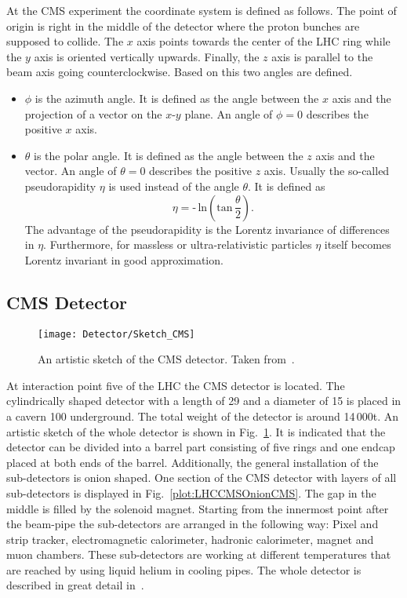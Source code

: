 At the CMS experiment the coordinate system is defined as follows. The point of origin is right in the middle of the detector where the proton bunches are supposed to collide. The $x$ axis points towards the center of the LHC ring while the $y$ axis is oriented vertically upwards. Finally, the $z$ axis is parallel to the beam axis going counterclockwise. Based on this two angles are defined.
\begin{itemize}
    \item{$\phi{}$} is the azimuth angle. It is defined as the angle between the $x$ axis and the projection of a vector on the $x$-$y$ plane. An angle of $\phi{} = 0$ describes the positive $x$ axis.
    \item{$\theta{}$} is the polar angle. It is defined as the angle between the $z$ axis and the vector. An angle of $\theta{} = 0$ describes the positive $z$ axis. Usually the so-called pseudorapidity $\eta{}$ is used instead of the angle $\theta$. It is defined as
    \begin{equation}
        \eta{} = \textrm{-}\,{}\textrm{ln} \left( \textrm{tan}\,{}\frac{\theta{}}{2}\right).
        \label{eq:pseudorapidity}
    \end{equation}
    The advantage of the pseudorapidity is the Lorentz invariance of differences in $\eta{}$. Furthermore, for massless or ultra-relativistic particles $\eta$ itself becomes Lorentz invariant in good approximation.
\end{itemize}

\subsection{CMS Detector \label{LHCCMSCMSDet}}

\begin{figure}[Hb]
    \centering
    \texttt{[image: Detector/Sketch\_CMS]}
    \caption[Artistic sketch of the CMS detector]{An artistic sketch of the CMS detector. Taken from~. \label{plot:LHCCMSWholeCMS}}
\end{figure}

At interaction point five of the LHC the CMS detector is located. The cylindrically shaped detector with a length of 29\m{} and a diameter of 15\m{} is placed in a cavern 100\m{} underground. The total weight of the detector is around 14\,000\unit{t}. An artistic sketch of the whole detector is shown in Fig.~\ref{plot:LHCCMSWholeCMS}. It is indicated that the detector can be divided into a barrel part consisting of five rings and one endcap placed at both ends of the barrel. Additionally, the general installation of the sub-detectors is onion shaped. One section of the CMS detector with layers of all sub-detectors is displayed in Fig.~\ref{plot:LHCCMSOnionCMS}. The gap in the middle is filled by the solenoid magnet. Starting from the innermost point after the beam-pipe the sub-detectors are arranged in the following way: Pixel and strip tracker, electromagnetic calorimeter, hadronic calorimeter, magnet and muon chambers. These sub-detectors are working at different temperatures that are reached by using liquid helium in cooling pipes. The whole detector is described in great detail in~\cite{Chatrchyan:1129810}.


